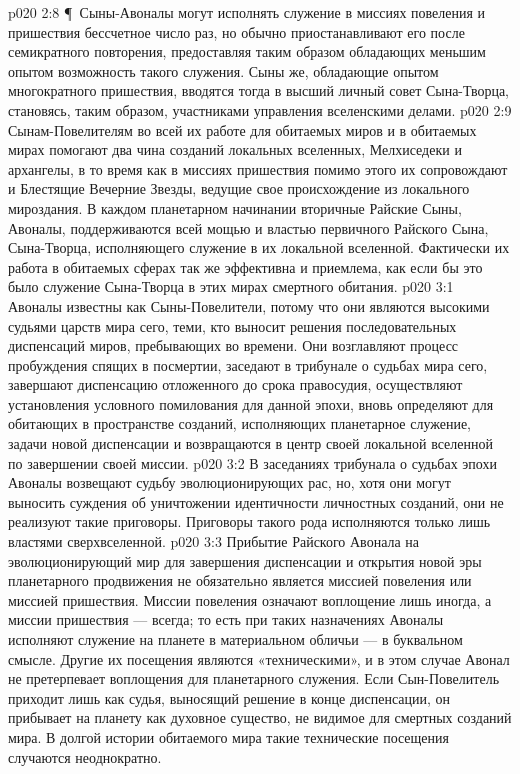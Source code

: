 \vs p020 2:8 \P\ Сыны\hyp{}Авоналы могут исполнять служение в миссиях повеления и пришествия бессчетное число раз, но обычно приостанавливают его после семикратного повторения, предоставляя таким образом обладающих меньшим опытом возможность такого служения. Сыны же, обладающие опытом многократного пришествия, вводятся тогда в высший личный совет Сына\hyp{}Творца, становясь, таким образом, участниками управления вселенскими делами.
\vs p020 2:9 Сынам\hyp{}Повелителям во всей их работе для обитаемых миров и в обитаемых мирах помогают два чина созданий локальных вселенных, Мелхиседеки и архангелы, в то время как в миссиях пришествия помимо этого их сопровождают и Блестящие Вечерние Звезды, ведущие свое происхождение из локального мироздания. В каждом планетарном начинании вторичные Райские Сыны, Авоналы, поддерживаются всей мощью и властью первичного Райского Сына, Сына\hyp{}Творца, исполняющего служение в их локальной вселенной. Фактически их работа в обитаемых сферах так же эффективна и приемлема, как если бы это было служение Сына\hyp{}Творца в этих мирах смертного обитания.
\vs p020 3:1 Авоналы известны как Сыны\hyp{}Повелители, потому что они являются высокими судьями царств мира сего, теми, кто выносит решения последовательных диспенсаций миров, пребывающих во времени. Они возглавляют процесс пробуждения спящих в посмертии, заседают в трибунале о судьбах мира сего, завершают диспенсацию отложенного до срока правосудия, осуществляют установления условного помилования для данной эпохи, вновь определяют для обитающих в пространстве созданий, исполняющих планетарное служение, задачи новой диспенсации и возвращаются в центр своей локальной вселенной по завершении своей миссии.
\vs p020 3:2 В заседаниях трибунала о судьбах эпохи Авоналы возвещают судьбу эволюционирующих рас, но, хотя они могут выносить суждения об уничтожении идентичности личностных созданий, они не реализуют такие приговоры. Приговоры такого рода исполняются только лишь властями сверхвселенной.
\vs p020 3:3 Прибытие Райского Авонала на эволюционирующий мир для завершения диспенсации и открытия новой эры планетарного продвижения не обязательно является миссией повеления или миссией пришествия. Миссии повеления означают воплощение лишь иногда, а миссии пришествия --- всегда; то есть при таких назначениях Авоналы исполняют служение на планете в материальном обличьи --- в буквальном смысле. Другие их посещения являются «техническими», и в этом случае Авонал не претерпевает воплощения для планетарного служения. Если Сын\hyp{}Повелитель приходит лишь как судья, выносящий решение в конце диспенсации, он прибывает на планету как духовное существо, не видимое для смертных созданий мира. В долгой истории обитаемого мира такие технические посещения случаются неоднократно.
